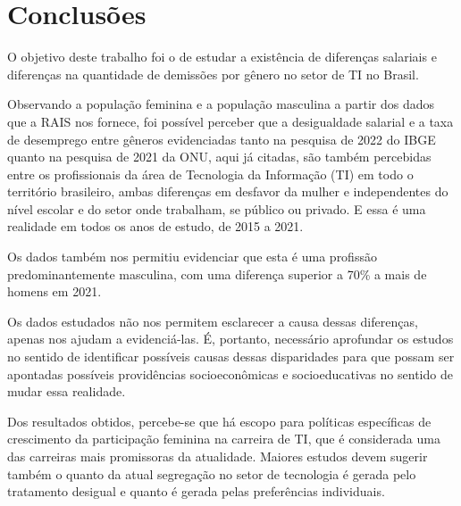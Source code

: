 \section{Conclusões}

O objetivo deste trabalho foi o de estudar a existência de diferenças salariais e diferenças na quantidade de demissões por gênero no setor de TI no Brasil.

Observando a população feminina e a população masculina a partir dos dados que a RAIS nos fornece, foi possível perceber que a desigualdade salarial e a taxa de desemprego entre gêneros evidenciadas tanto na pesquisa de 2022 do IBGE quanto na pesquisa de 2021 da ONU, aqui já citadas,  são também percebidas entre os profissionais da área de Tecnologia da Informação (TI) em todo o território brasileiro, ambas diferenças em desfavor da mulher e independentes do nível escolar e do setor onde trabalham, se público ou privado. E essa é uma realidade em todos os anos de estudo, de 2015 a 2021.

Os dados também nos permitiu evidenciar que esta é uma profissão predominantemente masculina, com uma diferença superior a 70\% a mais de homens em 2021.

Os dados estudados não nos permitem esclarecer a causa dessas diferenças, apenas nos ajudam a evidenciá-las. É, portanto, necessário aprofundar os estudos no sentido de identificar possíveis causas dessas disparidades para que possam ser apontadas possíveis providências socioeconômicas e socioeducativas no sentido de mudar essa realidade. 

Dos resultados obtidos, percebe-se que há escopo para políticas específicas de crescimento da participação feminina na carreira de TI, que é considerada uma das carreiras mais promissoras da atualidade. Maiores estudos devem sugerir também o quanto da atual segregação no setor de tecnologia é gerada pelo tratamento desigual e quanto é gerada pelas preferências individuais.





